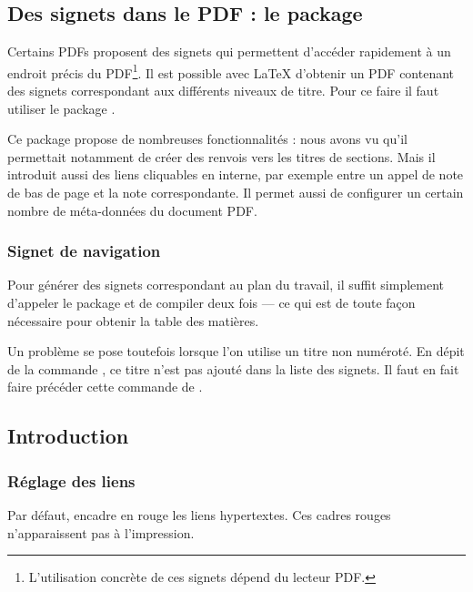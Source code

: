 \section{Des signets dans le PDF : le package }\label{hyperref}


Certains PDFs proposent des signets qui permettent d'accéder rapidement à un endroit précis du PDF\footnote{L'utilisation concrète de ces signets dépend du lecteur PDF.}. Il est possible avec \LaTeX{} d'obtenir un PDF contenant des signets correspondant aux différents niveaux de titre. Pour ce faire il faut utiliser le package .

Ce package propose de nombreuses fonctionnalités :  nous avons vu  qu'il permettait notamment de créer des renvois vers les titres de sections.
Mais il introduit aussi des liens cliquables en interne, par exemple entre un appel de note de bas de page et la note correspondante. Il permet aussi de configurer un certain nombre de méta-données du document PDF.

\subsection{Signet de navigation}

Pour générer des signets correspondant au plan du travail, il suffit simplement d'appeler le package et de compiler deux fois --- ce qui est de toute façon nécessaire pour obtenir la table des matières.

Un problème se pose toutefois lorsque l'on utilise un titre non numéroté. En dépit de  la commande , ce titre n'est pas ajouté dans la liste des signets. Il faut en fait faire précéder cette commande de .

\begin{latexcode}
{}
\chapter*{Introduction}
\end{latexcode}

\subsection{Réglage des liens}
Par défaut,  encadre en rouge les liens hypertextes. Ces cadres rouges n'apparaissent pas à l'impression.

